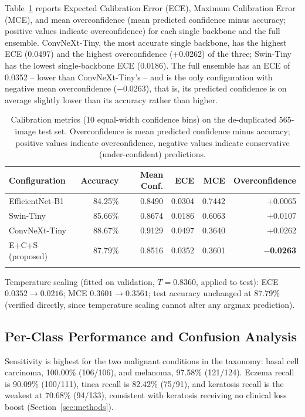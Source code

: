 \documentclass[VANCOUVER,twocolumn]{USG}
\begin{document}
Table~\ref{tab:calibration} reports Expected Calibration Error (ECE),
Maximum Calibration Error (MCE), and mean overconfidence (mean predicted
confidence minus accuracy; positive values indicate overconfidence) for
each single backbone and the full ensemble. ConvNeXt-Tiny, the most
accurate single backbone, has the highest ECE (0.0497) and the highest
overconfidence (+0.0262) of the three; Swin-Tiny has the lowest
single-backbone ECE (0.0186). The full ensemble has an ECE of 0.0352 --
lower than ConvNeXt-Tiny's -- and is the only configuration with negative
mean overconfidence ($-$0.0263), that is, its predicted confidence is on
average slightly lower than its accuracy rather than higher.

\begin{table}[htbp]
\caption{Calibration metrics (10 equal-width confidence bins) on the
de-duplicated 565-image test set. Overconfidence is mean predicted
confidence minus accuracy; positive values indicate overconfidence,
negative values indicate conservative (under-confident)
predictions.}\label{tab:calibration}
\begin{tabular}{@{}lrrrrr@{}}
\toprule
Configuration & Accuracy & Mean Conf. & ECE & MCE & Overconfidence \\
\midrule
EfficientNet-B1 & 84.25\% & 0.8490 & 0.0304 & 0.7442 & +0.0065 \\
Swin-Tiny & 85.66\% & 0.8674 & 0.0186 & 0.6063 & +0.0107 \\
ConvNeXt-Tiny & 88.67\% & 0.9129 & 0.0497 & 0.3640 & +0.0262 \\
E+C+S (proposed) & 87.79\% & 0.8516 & 0.0352 & 0.3601 & \textbf{$-$0.0263} \\
\botrule
\end{tabular}

\vspace{4pt}
\footnotesize
Temperature scaling (fitted on validation, $T=0.8360$, applied to test):
ECE $0.0352 \rightarrow 0.0216$; MCE $0.3601 \rightarrow 0.3561$; test
accuracy unchanged at 87.79\% (verified directly, since temperature
scaling cannot alter any argmax prediction).
\end{table}

\subsection{Per-Class Performance and Confusion Analysis}

Sensitivity is highest for the two malignant conditions in the taxonomy:
basal cell carcinoma, 100.00\% (106/106), and melanoma, 97.58\%
(121/124). Eczema recall is 90.09\% (100/111), tinea recall is 82.42\%
(75/91), and keratosis recall is the weakest at 70.68\% (94/133),
consistent with keratosis receiving no clinical loss boost
(Section~\ref{sec:methods}).
\end{document}
